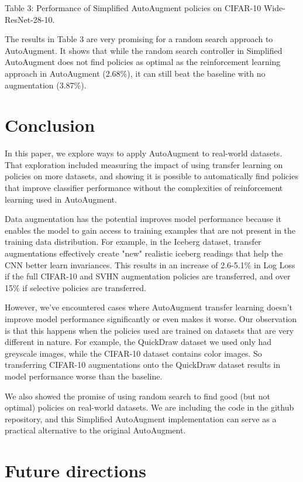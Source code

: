 \documentclass[10pt,twocolumn,letterpaper]{article}
\begin{document}
Table 3: Performance of Simplified AutoAugment policies on CIFAR-10 Wide-ResNet-28-10.

The results in Table 3 are very promising for a random search approach to AutoAugment.  It shows that while the random search controller in Simplified AutoAugment does not find policies as optimal as the reinforcement learning approach in AutoAugment (2.68\%), it can still beat the baseline with no augmentation (3.87\%).   

\section{Conclusion}

In this paper, we explore ways to apply AutoAugment to real-world datasets. That exploration included measuring the impact of using transfer learning on policies on more datasets, and showing it is possible to automatically find policies that improve classifier performance without the complexities of reinforcement learning used in AutoAugment.

Data augmentation has the potential improves model performance because it enables the model to gain access to training examples that are not present in the training data distribution. For example, in the Iceberg dataset, transfer augmentations effectively create "new" realistic iceberg readings that help the CNN better learn invariances.  This results in an increase of 2.6-5.1\% in Log Loss if the full CIFAR-10 and SVHN augmentation policies are transferred, and over 15\% if selective policies are transferred. 

However, we’ve encountered cases where AutoAugment transfer learning doesn’t improve model performance significantly or even makes it worse. Our observation is that this happens when the policies used are trained on datasets that are very different in nature. For example, the QuickDraw dataset we used only had greyscale images, while the CIFAR-10 dataset contains color images. So transferring CIFAR-10 augmentations onto the QuickDraw dataset results in model performance worse than the baseline.

We also showed the promise of using random search to find good (but not optimal) policies on real-world datasets.  We are including the code in the github repository, and this Simplified AutoAugment implementation can serve as a practical alternative to the original AutoAugment.

\section{Future directions}
\end{document}

